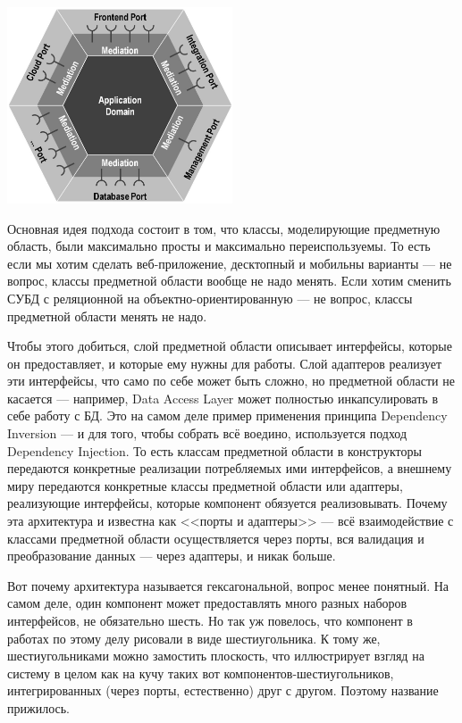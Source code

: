 \documentclass{../../text-style}
\begin{document}
\begin{center}
    \includegraphics[width=0.5\textwidth]{hexagonalArchitecture.png}
\end{center}

Основная идея подхода состоит в том, что классы, моделирующие предметную область, были максимально просты и максимально переиспользуемы. То есть если мы хотим сделать веб-приложение, десктопный и мобильны варианты --- не вопрос, классы предметной области вообще не надо менять. Если хотим сменить СУБД с реляционной на объектно-ориентированную --- не вопрос, классы предметной области менять не надо.

Чтобы этого добиться, слой предметной области описывает интерфейсы, которые он предоставляет, и которые ему нужны для работы. Слой адаптеров реализует эти интерфейсы, что само по себе может быть сложно, но предметной области не касается --- например, Data Access Layer может полностью инкапсулировать в себе работу с БД. Это на самом деле пример применения принципа Dependency Inversion --- и для того, чтобы собрать всё воедино, используется подход Dependency Injection. То есть классам предметной области в конструкторы передаются конкретные реализации потребляемых ими интерфейсов, а внешнему миру передаются конкретные классы предметной области или адаптеры, реализующие интерфейсы, которые компонент обязуется реализовывать. Почему эта архитектура и известна как <<порты и адаптеры>> --- всё взаимодействие с классами предметной области осуществляется через порты, вся валидация и преобразование данных --- через адаптеры, и никак больше.

Вот почему архитектура называется гексагональной, вопрос менее понятный. На самом деле, один компонент может предоставлять много разных наборов интерфейсов, не обязательно шесть. Но так уж повелось, что компонент в работах по этому делу рисовали в виде шестиугольника. К тому же, шестиугольниками можно замостить плоскость, что иллюстрирует взгляд на систему в целом как на кучу таких вот компонентов-шестиугольников, интегрированных (через порты, естественно) друг с другом. Поэтому название прижилось.
\end{document}
